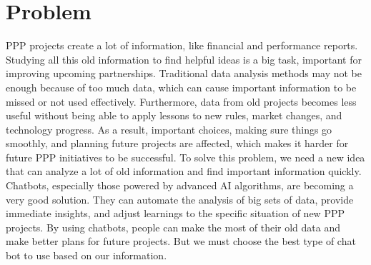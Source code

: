 \section{Problem}
PPP projects create a lot of information, like financial and performance reports. Studying all this old information to find helpful ideas is a big task, important for improving upcoming partnerships. Traditional data analysis methods may not be enough because of too much data, which can cause important information to be missed or not used effectively. 
\vskip 0.5cm
Furthermore, data from old projects becomes less useful without being able to apply lessons to new rules, market changes, and technology progress. As a result, important choices, making sure things go smoothly, and planning future projects are affected, which makes it harder for future PPP initiatives to be successful.
\vskip 0.5cm
To solve this problem, we need a new idea that can analyze a lot of old information and find important information quickly. Chatbots, especially those powered by advanced AI algorithms, are becoming a very good solution. They can automate the analysis of big sets of data, provide immediate insights, and adjust learnings to the specific situation of new PPP projects. By using chatbots, people can make the most of their old data and make better plans for future projects. But we must choose the best type of chat bot to use based on our information.
